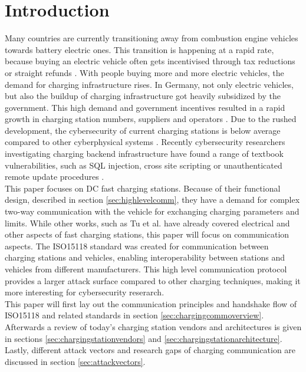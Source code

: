 \documentclass[conference,flushend]{iaria} %
\begin{document}
\section{Introduction}
Many countries are currently transitioning away from combustion engine vehicles towards battery electric ones.
This transition is happening at a rapid rate, because buying an electric vehicle often gets incentivised through tax reductions or straight refunds \cite{kraftfahrtbundesamt_anzahl_2024}.
With people buying more and more electric vehicles, the demand for charging infrastructure rises.
In Germany, not only electric vehicles, but also the buildup of charging infrastructure got heavily subsidized by the government.
This high demand and government incentives resulted in a rapid growth in charging station numbers, suppliers and operators \cite{bundesnetzagentur_anzahl_2024}.
Due to the rushed development, the cybersecurity of current charging stations is below average compared to other cyberphysical systems \cite{nasr_power_2022, johnson_review_2022, ahalawat_security_2022}.
Recently cybersecurity researchers investigating charging backend infrastructure have found a range of textbook vulnerabilities, such as SQL injection, cross site scripting or unauthenticated remote update procedures \cite{nasr_power_2022}.
\\
This paper focuses on DC fast charging stations. Because of their functional design, described in section \ref{sec:highlevelcomm}, they have a demand for complex two-way communication with the vehicle for exchanging charging parameters and limits.
While other works, such as Tu et al. \cite{tu_extreme_2019} have already covered electrical and other aspects of fast charging stations, this paper will focus on communication aspects.
The ISO15118 standard was created for communication between charging stations and vehicles, enabling interoperability between stations and vehicles from different manufacturers.
This high level communication protocol provides a larger attack surface compared to other charging techniques, making it more interesting for cybersecurity reserarch. \\
This paper will first lay out the communication principles and handshake flow of ISO15118 and related standards in section \ref{sec:chargingcommoverview}.
Afterwards a review of today's charging station vendors and architectures is given in sections \ref{sec:chargingstationvendors} and \ref{sec:chargingstationarchitecture}.
Lastly, different attack vectors and research gaps of charging communication are discussed in section \ref{sec:attackvectors}.
\end{document}
